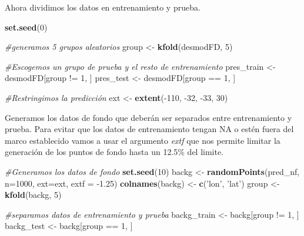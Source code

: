 \documentclass[]{article}
\newenvironment{Shaded}{\begin{snugshade}}{\end{snugshade}}
\newcommand{\KeywordTok}[1]{\textcolor[rgb]{0.13,0.29,0.53}{\textbf{{#1}}}}
\newcommand{\DataTypeTok}[1]{\textcolor[rgb]{0.13,0.29,0.53}{{#1}}}
\newcommand{\DecValTok}[1]{\textcolor[rgb]{0.00,0.00,0.81}{{#1}}}
\newcommand{\FloatTok}[1]{\textcolor[rgb]{0.00,0.00,0.81}{{#1}}}
\newcommand{\StringTok}[1]{\textcolor[rgb]{0.31,0.60,0.02}{{#1}}}
\newcommand{\CommentTok}[1]{\textcolor[rgb]{0.56,0.35,0.01}{\textit{{#1}}}}
\newcommand{\NormalTok}[1]{{#1}}
\begin{document}
Ahora dividimos los datos en entrenamiento y prueba.

\begin{Shaded}
\begin{Highlighting}[]
\KeywordTok{set.seed}\NormalTok{(}\DecValTok{0}\NormalTok{)}

\CommentTok{#generamos 5 grupos aleatorios}
\NormalTok{group <-}\StringTok{ }\KeywordTok{kfold}\NormalTok{(desmodFD, }\DecValTok{5}\NormalTok{)}

\CommentTok{#Escogemos un grupo de prueba y el resto de entrenamiento}
\NormalTok{pres_train <-}\StringTok{ }\NormalTok{desmodFD[group !=}\StringTok{ }\DecValTok{1}\NormalTok{, ]}
\NormalTok{pres_test <-}\StringTok{ }\NormalTok{desmodFD[group ==}\StringTok{ }\DecValTok{1}\NormalTok{, ]}

\CommentTok{#Restringimos la predicción }
\NormalTok{ext <-}\StringTok{ }\KeywordTok{extent}\NormalTok{(-}\DecValTok{110}\NormalTok{, -}\DecValTok{32}\NormalTok{, -}\DecValTok{33}\NormalTok{, }\DecValTok{30}\NormalTok{)}
\end{Highlighting}
\end{Shaded}

Generamos los datos de fondo que deberán ser separados entre
entrenamiento y prueba. Para evitar que los datos de entrenamiento
tengan NA o estén fuera del marco establecido vamos a usar el argumento
\emph{extf} que nos permite limitar la generación de los puntos de fondo
hasta un 12.5\% del limite.

\begin{Shaded}
\begin{Highlighting}[]
\CommentTok{#Generamos los datos de fondo}
\KeywordTok{set.seed}\NormalTok{(}\DecValTok{10}\NormalTok{)}
\NormalTok{backg <-}\StringTok{ }\KeywordTok{randomPoints}\NormalTok{(pred_nf, }\DataTypeTok{n=}\DecValTok{1000}\NormalTok{, }\DataTypeTok{ext=}\NormalTok{ext, }\DataTypeTok{extf =} \NormalTok{-}\FloatTok{1.25}\NormalTok{)}
\KeywordTok{colnames}\NormalTok{(backg) <-}\StringTok{ }\KeywordTok{c}\NormalTok{(}\StringTok{'lon'}\NormalTok{, }\StringTok{'lat'}\NormalTok{)}
\NormalTok{group <-}\StringTok{ }\KeywordTok{kfold}\NormalTok{(backg, }\DecValTok{5}\NormalTok{)}

\CommentTok{#separamos datos de entrenamiento y prueba}
\NormalTok{backg_train <-}\StringTok{ }\NormalTok{backg[group !=}\StringTok{ }\DecValTok{1}\NormalTok{, ]}
\NormalTok{backg_test <-}\StringTok{ }\NormalTok{backg[group ==}\StringTok{ }\DecValTok{1}\NormalTok{, ]}
\end{Highlighting}
\end{Shaded}
\end{document}
